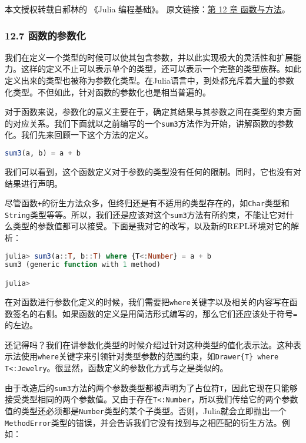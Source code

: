 
本文授权转载自郝林的 《Julia 编程基础》。 原文链接：\href{https://github.com/hyper0x/JuliaBasics/blob/master/book/ch12.md}{第 12 章 函数与方法}。


\subsubsection{12.7 函数的参数化}

我们在定义一个类型的时候可以使其包含参数，并以此实现极大的灵活性和扩展能力。这样的定义不止可以表示单个的类型，还可以表示一个完整的类型族群。如此定义出来的类型也被称为参数化类型。在Julia语言中，到处都充斥着大量的参数化类型。不但如此，针对函数的参数化也是相当普遍的。

对于函数来说，参数化的意义主要在于，确定其结果与其参数之间在类型约束方面的对应关系。我们下面就以之前编写的一个\verb|sum3|方法作为开始，讲解函数的参数化。我们先来回顾一下这个方法的定义。

\begin{lstlisting}[language=julia]
sum3(a, b) = a + b
\end{lstlisting}

我们可以看到，这个函数定义对于参数的类型没有任何的限制。同时，它也没有对结果进行声明。

尽管函数\verb|+|的衍生方法众多，但终归还是有不适用的类型存在的，如\verb|Char|类型和\verb|String|类型等等。所以，我们还是应该对这个\verb|sum3|方法有所约束，不能让它对什么类型的参数值都可以接受。下面是我对它的改写，以及新的REPL环境对它的解析：

\begin{lstlisting}[language=julia]
julia> sum3(a::T, b::T) where {T<:Number} = a + b
sum3 (generic function with 1 method)

julia> 
\end{lstlisting}

在对函数进行参数化定义的时候，我们需要把\verb|where|关键字以及相关的内容写在函数签名的右侧。如果函数的定义是用简洁形式编写的，那么它们还应该处于符号\verb|=|的左边。

还记得吗？我们在讲参数化类型的时候介绍过针对这种类型的值化表示法。这种表示法使用\verb|where|关键字来引领针对类型参数的范围约束，如\verb|Drawer{T} where T<:Jewelry|。很显然，函数定义的参数化方式与之是类似的。

由于改造后的\verb|sum3|方法的两个参数类型都被声明为了占位符\verb|T|，因此它现在只能够接受类型相同的两个参数值。又由于存在\verb|T<:Number|，所以我们传给它的两个参数值的类型还必须都是\verb|Number|类型的某个子类型。否则，Julia就会立即抛出一个\verb|MethodError|类型的错误，并会告诉我们它没有找到与之相匹配的衍生方法。例如：

